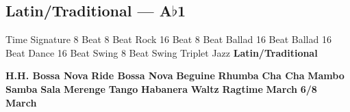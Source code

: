 \subsection{Latin/Traditional --- A$\flat$1}
Time Signature
8 Beat
8 Beat Rock
16 Beat
8 Beat Ballad
16 Beat Ballad
16 Beat Dance
16 Beat Swing
8 Beat Swing
Triplet
Jazz
\textbf{Latin/Traditional}





























\textbf{H.H. Bossa Nova}
\textbf{Ride Bossa Nova}
\textbf{Beguine}
\textbf{Rhumba}
\textbf{Cha Cha}
\textbf{Mambo}
\textbf{Samba}
\textbf{Sala}
\textbf{Merenge}
\textbf{Tango}
\textbf{Habanera}
\textbf{Waltz}
\textbf{Ragtime}
\textbf{March}
\textbf{6/8 March}
